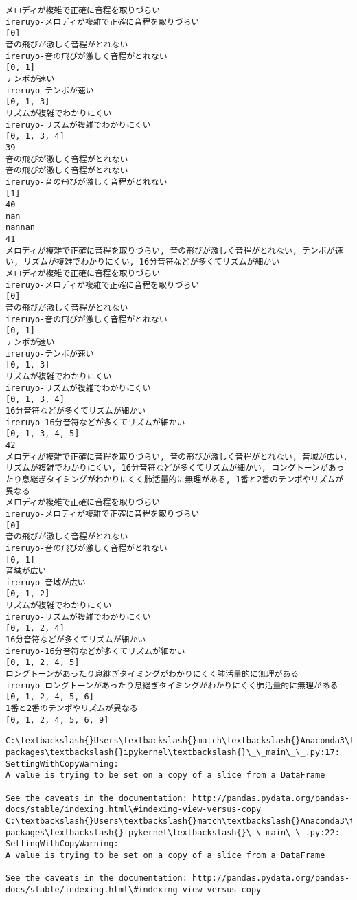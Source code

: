 \documentclass[11pt]{article}
\begin{document}
\begin{Verbatim}[commandchars=\\\{\}]
メロディが複雑で正確に音程を取りづらい
ireruyo-メロディが複雑で正確に音程を取りづらい
[0]
音の飛びが激しく音程がとれない
ireruyo-音の飛びが激しく音程がとれない
[0, 1]
テンポが速い
ireruyo-テンポが速い
[0, 1, 3]
リズムが複雑でわかりにくい
ireruyo-リズムが複雑でわかりにくい
[0, 1, 3, 4]
39
音の飛びが激しく音程がとれない
音の飛びが激しく音程がとれない
ireruyo-音の飛びが激しく音程がとれない
[1]
40
nan
nannan
41
メロディが複雑で正確に音程を取りづらい, 音の飛びが激しく音程がとれない, テンポが速い, リズムが複雑でわかりにくい, 16分音符などが多くてリズムが細かい
メロディが複雑で正確に音程を取りづらい
ireruyo-メロディが複雑で正確に音程を取りづらい
[0]
音の飛びが激しく音程がとれない
ireruyo-音の飛びが激しく音程がとれない
[0, 1]
テンポが速い
ireruyo-テンポが速い
[0, 1, 3]
リズムが複雑でわかりにくい
ireruyo-リズムが複雑でわかりにくい
[0, 1, 3, 4]
16分音符などが多くてリズムが細かい
ireruyo-16分音符などが多くてリズムが細かい
[0, 1, 3, 4, 5]
42
メロディが複雑で正確に音程を取りづらい, 音の飛びが激しく音程がとれない, 音域が広い, リズムが複雑でわかりにくい, 16分音符などが多くてリズムが細かい, ロングトーンがあったり息継ぎタイミングがわかりにくく肺活量的に無理がある, 1番と2番のテンポやリズムが異なる
メロディが複雑で正確に音程を取りづらい
ireruyo-メロディが複雑で正確に音程を取りづらい
[0]
音の飛びが激しく音程がとれない
ireruyo-音の飛びが激しく音程がとれない
[0, 1]
音域が広い
ireruyo-音域が広い
[0, 1, 2]
リズムが複雑でわかりにくい
ireruyo-リズムが複雑でわかりにくい
[0, 1, 2, 4]
16分音符などが多くてリズムが細かい
ireruyo-16分音符などが多くてリズムが細かい
[0, 1, 2, 4, 5]
ロングトーンがあったり息継ぎタイミングがわかりにくく肺活量的に無理がある
ireruyo-ロングトーンがあったり息継ぎタイミングがわかりにくく肺活量的に無理がある
[0, 1, 2, 4, 5, 6]
1番と2番のテンポやリズムが異なる
[0, 1, 2, 4, 5, 6, 9]

    \end{Verbatim}

    \begin{Verbatim}[commandchars=\\\{\}]
C:\textbackslash{}Users\textbackslash{}match\textbackslash{}Anaconda3\textbackslash{}lib\textbackslash{}site-packages\textbackslash{}ipykernel\textbackslash{}\_\_main\_\_.py:17: SettingWithCopyWarning: 
A value is trying to be set on a copy of a slice from a DataFrame

See the caveats in the documentation: http://pandas.pydata.org/pandas-docs/stable/indexing.html\#indexing-view-versus-copy
C:\textbackslash{}Users\textbackslash{}match\textbackslash{}Anaconda3\textbackslash{}lib\textbackslash{}site-packages\textbackslash{}ipykernel\textbackslash{}\_\_main\_\_.py:22: SettingWithCopyWarning: 
A value is trying to be set on a copy of a slice from a DataFrame

See the caveats in the documentation: http://pandas.pydata.org/pandas-docs/stable/indexing.html\#indexing-view-versus-copy

    \end{Verbatim}
\end{document}
